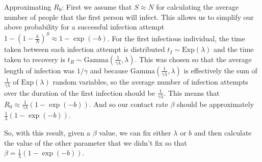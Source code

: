\documentclass[11pt]{article}
\begin{document}
Approximating $R_0$: First we assume that $S\approx N$ for calculating the average number of people that the first person will infect. This allows us to simplify our above probability for a successful infection attempt $1-(1-\frac{b}{N})^S\approx 1-\exp(-b)$. For the first infectious individual, the time taken between each infection attempt is distributed $t_I\sim \text{Exp}(\lambda)$ and the time taken to recovery is $t_R \sim \text{Gamma}(\frac{1}{\gamma\lambda}, \lambda)$. This was chosen so that the average length of infection was $1/\gamma$ and because $\text{Gamma}(\frac{1}{\gamma\lambda}, \lambda)$ is effectively the sum of $\frac{1}{\gamma\lambda}$ of $\text{Exp}(\lambda)$ random variables, so the average number of infection attempts over the duration of the first infection should be $\frac{1}{\gamma\lambda}$. This means that $R_0\approx\frac{1}{\gamma\lambda}(1-\exp(-b))$. And so our contact rate $\beta$ should be approximately $\frac{1}{\lambda}(1-\exp(-b))$.

So, with this result, given a $\beta$ value, we can fix either $\lambda$ or $b$ and then calculate the value of the other parameter that we didn't fix so that $\beta = \frac{1}{\lambda}(1-\exp(-b))$.
\end{document}
